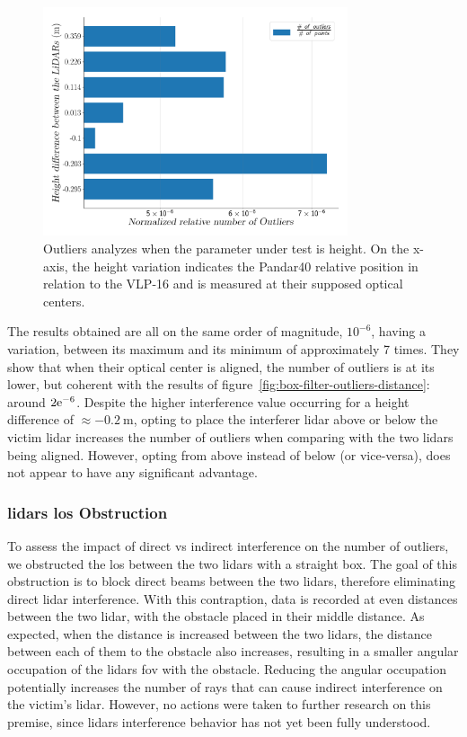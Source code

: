 \begin{figure}[!ht]
	\centering
	\includegraphics[width=0.8\textwidth]{img/lidar-interference/box-filtering/interference-box-filter-outliers-height.png}
	\caption{Outliers analyzes when the parameter under test is height. On the x-axis, the height variation indicates the Pandar40 relative position in relation to the VLP-16 and is measured at their supposed optical centers.}
	\label{fig:box-filter-outliers-height}
\end{figure}

The results obtained are all on the same order of magnitude, $10^{-6}$, having a variation, between its maximum and its minimum of approximately 7 times. They show that when their optical center is aligned, the number of outliers is at its lower, but coherent with the results of figure~\ref{fig:box-filter-outliers-distance}: around $2\mathrm{e}^{-6}$. Despite the higher interference value occurring for a height difference of $\approx \SI{-0.2}{\meter}$, opting to place the interferer \ac{lidar} above or below the victim \ac{lidar} increases the number of outliers when comparing with the two \acp{lidar} being aligned. However, opting from above instead of below (or vice-versa), does not appear to have any significant advantage. 

\subsubsection{\acp{lidar} \ac{los} Obstruction}
To assess the impact of direct vs indirect interference on the number of outliers, we obstructed the \acf{los} between the two \acp{lidar} with a straight box. The goal of this obstruction is to block direct beams between the two \acp{lidar}, therefore eliminating direct \ac{lidar} interference. With this contraption, data is recorded at even distances between the two \ac{lidar}, with the obstacle placed in their middle distance. As expected, when the distance is increased between the two \acp{lidar}, the distance between each of them to the obstacle also increases, resulting in a smaller angular occupation of the \acp{lidar} \ac{fov} with the obstacle. Reducing the angular occupation potentially increases the number of rays that can cause indirect interference on the victim's \ac{lidar}. However, no actions were taken to further research on this premise, since \acp{lidar} interference behavior has not yet been fully understood.

